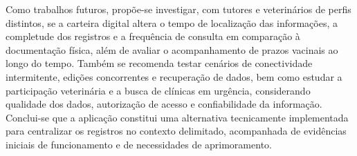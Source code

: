 \documentclass{UNESC}
\begin{document}
Como trabalhos futuros, propõe-se investigar, com tutores e veterinários de perfis distintos, se a carteira digital altera o tempo de localização das informações, a completude dos registros e a frequência de consulta em comparação à documentação física, além de avaliar o acompanhamento de prazos vacinais ao longo do tempo. Também se recomenda testar cenários de conectividade intermitente, edições concorrentes e recuperação de dados, bem como estudar a participação veterinária e a busca de clínicas em urgência, considerando qualidade dos dados, autorização de acesso e confiabilidade da informação. Conclui-se que a aplicação constitui uma alternativa tecnicamente implementada para centralizar os registros no contexto delimitado, acompanhada de evidências iniciais de funcionamento e de necessidades de aprimoramento.


\renewcommand{\refname}{REFERÊNCIAS}

\end{document}
